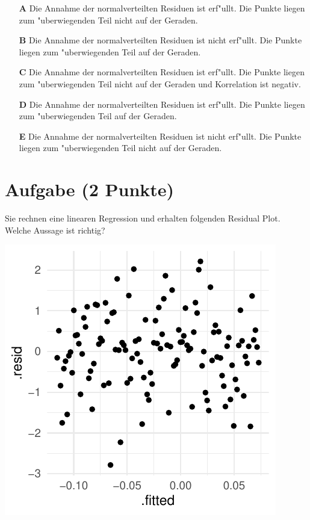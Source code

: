 \documentclass[a4paper, 9pt]{scrartcl}\usepackage[]{graphicx}\usepackage[]{xcolor}
\makeatletter
\def\maxwidth{ %
  \ifdim\Gin@nat@width>\linewidth
    \linewidth
  \else
    \Gin@nat@width
  \fi
}
\makeatother
\begin{document}
\begin{enumerate}
\item [\textbf{A} \msquare] Die Annahme der normalverteilten Residuen ist erf{"u}llt. Die Punkte liegen zum {"u}berwiegenden Teil nicht auf der Geraden.
\item [\textbf{B} \msquare] Die Annahme der normalverteilten Residuen ist nicht erf{"u}llt. Die Punkte liegen zum {"u}berwiegenden Teil auf der Geraden.
\item [\textbf{C} \msquare] Die Annahme der normalverteilten Residuen ist erf{"u}llt. Die Punkte liegen zum {"u}berwiegenden Teil nicht auf der Geraden und Korrelation ist negativ.
\item [\textbf{D} \msquare] Die Annahme der normalverteilten Residuen ist erf{"u}llt. Die Punkte liegen zum {"u}berwiegenden Teil auf der Geraden.
\item [\textbf{E} \msquare] Die Annahme der normalverteilten Residuen ist nicht erf{"u}llt. Die Punkte liegen zum {"u}berwiegenden Teil nicht auf der Geraden.
\end{enumerate}

\section{Aufgabe \hfill (2 Punkte)}

Sie rechnen eine linearen Regression und erhalten folgenden Residual
Plot. Welche Aussage ist richtig?




{\centering \includegraphics[width=\maxwidth]{img/mc-regression-06-a-1} 

}
\end{document}
